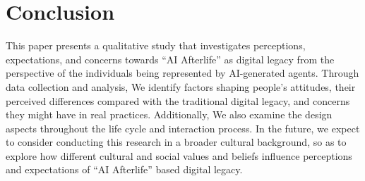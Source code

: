 \section{Conclusion}
This paper presents a qualitative study that investigates perceptions, expectations, and concerns towards ``AI Afterlife'' as digital legacy from the perspective of the individuals being represented by AI-generated agents. 
Through data collection and analysis, We identify factors shaping people's attitudes, their perceived differences compared with the traditional digital legacy, and concerns they might have in real practices. Additionally, We also examine the design aspects throughout the life cycle and interaction process. 
In the future, we expect to consider conducting this research in a broader cultural background, so as to explore how different cultural and social values and beliefs influence perceptions and expectations of ``AI Afterlife'' based digital legacy. 
